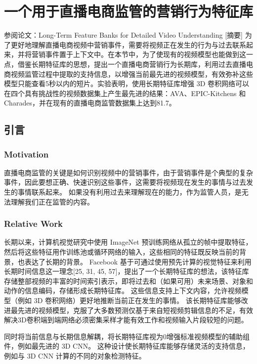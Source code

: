 \chapter{一个用于直播电商监管的营销行为特征库}
参阅论文：Long-Term Feature Banks for Detailed Video Understanding
\href{https://github.com/facebookresearch/video-long-term-feature-banks}

[摘要]
为了更好地理解直播电商视频中营销事件，需要将视频正在发生的行为与过去联系起来，并将营销事件置于上下文中。在本节中，为了使现有的视频模型也能做到这一点，借鉴长期特征库的思想，提出一个直播电商营销行为长期库，利用过去直播电商视频监管过程中提取的支持信息，以增强当前最先进的视频模型，有效弥补这些模型只能查看5秒以内的短片。实验表明，使用长期特征库增强 3D 卷积网络可以在四个具有挑战性的视频数据集上产生最先进的结果：AVA、EPIC-Kitchens 和 Charades，并在现有的直播电商监管数据集上达到81.7。

\section{引言}
\subsection{Motivation}
直播电商监管的关键是如何识别视频中的营销事件，由于营销事件是个典型的复杂事件，因此要想正确、快速识别这些事件，这需要将视频现在发生的事情与过去发生的事情联系起来。 如果没有利用过去来理解现在的能力，作为监管人员，是无法理解我们正在监管的内容。

\subsection{Relative Work}
长期以来，计算机视觉研究中使用 ImageNet 预训练网络从孤立的帧中提取特征，然后将这些特征用作训练池或循环网络的输入，这些相同的特征既反映当前的背景，也表达了长期的背景。 Facebook 基于可通过使用预先计算的视觉特征来利用长期时间信息这一理念[25, 31, 45, 57]，提出了一个长期特征库的想法，该特征库存储整部视频的丰富的时间索引表示，即将过去和（如果可用）未来场景、对象和动作的信息编码，存储形成长期特征库。 这些信息支持上下文内容，允许视频模型（例如 3D 卷积网络）更好地推断当前正在发生的事情。 该长期特征库能够改进最先进的视频模型，克服了大多数预测仅基于来自短视频剪辑信息的不足，有效解决3D卷积端到端网络必须密集采样才能有效工作和视频输入片段较短的问题。

同时将当前信息与长期信息解耦，将长期特征库视为0增强标准视频模型的辅助组件，例如最先进的 3D CNN。 这种设计使长期特征库能够存储灵活的支持信息，例如与 3D CNN 计算的不同的对象检测特征。

